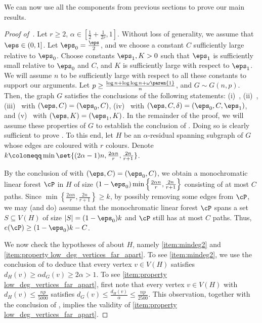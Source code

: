\documentclass[10pt,a4paper,reqno]{amsart}
\begin{document}
We can now use all the components from previous sections to prove our main results. 
\main*
\begin{proof}[Proof of~]
Let $r \geq 2$, $\alpha \in [\frac{1}{2} + \frac{1}{2r}, 1]$. Without loss of generality, we assume that $\eps \in (0,1]$. Let $\eps_0 = \frac{\eps}{2}$, and we choose a constant $C$ sufficiently large relative to $\eps_0$. Choose constants $\eps_1, K >0$ such that $\eps_1$ is sufficiently small relative to $\eps_0$ and $C$, and $K$ is sufficiently large with respect to $\eps_1$. We will assume $n$ to be sufficiently large with respect to all these constants to support our arguments. Let $p \geq \frac{\log{n} + \log{\log{n}} + \omega\paren{1}}{n}$, and $G \sim G(n, p)$. Then, \whp the graph $G$ satisfies the conclusions of the following statements: (i)~, (ii)~, (iii)~ with $(\eps, C) = (\eps_0, C)$, (iv)~ with $(\eps, C, \delta) = (\eps_0, C, \eps_1)$, and (v)~ with $(\eps, K) = (\eps_1, K)$. In the remainder of the proof, we will assume these \whp properties of $G$ to establish the conclusion of . Doing so is clearly sufficient to prove .
To this end, let $H$ be an $\alpha$-residual spanning subgraph of $G$ whose edges are coloured with $r$ colours. 
Denote $k\coloneqq \min\set{(2\alpha - 1)n, \frac{2\alpha n}{r}, \frac{2n}{r+1}}$.

By the conclusion of  with $(\eps, C) = (\eps_0, C)$, we obtain a monochromatic linear forest $\cP$ in $H$ of size $(1 - \eps_0)\min\left\{ \frac{2\alpha n}{r}, \frac{2n}{r+1} \right\}$ consisting of at most $C$ paths. Since $\min\left\{ \frac{2\alpha n}{r}, \frac{2n}{r+1} \right\}\geq k$, by possibly removing some edges from $\cP$, we may (and do) assume that the monochromatic linear forest $\cP$ spans a set $S\subseteq V(H)$ of size $|S| = (1 - \eps_0) k$ and $\cP$ still has at most $C$ paths. Thus, $e(\cP)\ge (1 - \eps_0) k - C$.

We now check the hypotheses of  about $H$, namely \ref{item:mindeg2} and \ref{item:property low_deg_vertices_far_apart}. To see \ref{item:mindeg2}, we use the conclusion of  to deduce that every vertex $v\in V(H)$ satisfies $d_H(v) \geq \alpha d_G(v) \geq 2\alpha > 1$. To see \ref{item:property low_deg_vertices_far_apart}, first note that every vertex $v\in V(H)$ with $d_H(v)\le \frac{np}{5000}$ satisfies $d_G(v)\le \frac{d_H(v)}{\alpha}\le \frac{np}{2500}$. This observation, together with the conclusion of , implies the validity of \ref{item:property low_deg_vertices_far_apart}.


\end{proof}
\end{document}

